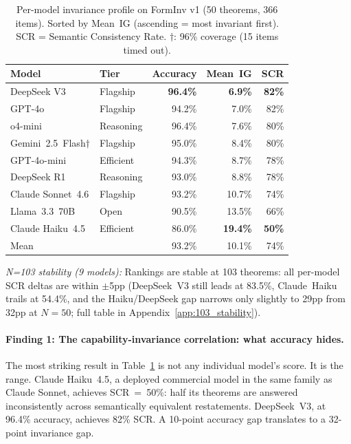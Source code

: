 \documentclass{article}
\begin{document}
\begin{table}[t]
\centering\small
\caption{Per-model invariance profile on FormInv v1 (50 theorems, 366 items). Sorted by Mean~IG (ascending = most invariant first). SCR = Semantic Consistency Rate. $\dagger$: 96\% coverage (15 items timed out).}
\label{tab:main}
\begin{tabular}{llrrr}
\toprule
Model & Tier & Accuracy & Mean~IG & SCR \\
\midrule
DeepSeek V3            & Flagship   & \textbf{96.4\%} & \textbf{6.9\%}  & \textbf{82\%} \\
GPT-4o                 & Flagship   & 94.2\% & 7.0\%  & 82\% \\
o4-mini                & Reasoning  & 96.4\% & 7.6\%  & 80\% \\
Gemini~2.5~Flash$\dagger$ & Flagship & 95.0\% & 8.4\%  & 80\% \\
GPT-4o-mini            & Efficient  & 94.3\% & 8.7\%  & 78\% \\
DeepSeek R1            & Reasoning  & 93.0\% & 8.8\%  & 78\% \\
Claude Sonnet~4.6      & Flagship   & 93.2\% & 10.7\% & 74\% \\
Llama~3.3~70B          & Open       & 90.5\% & 13.5\% & 66\% \\
Claude Haiku~4.5       & Efficient  & 86.0\% & \textbf{19.4\%} & \textbf{50\%} \\
\midrule
Mean                   &            & 93.2\% & 10.1\% & 74\% \\
\bottomrule
\end{tabular}
\medskip

\noindent\textit{N=103 stability (9 models):}
Rankings are stable at 103 theorems: all per-model SCR deltas are within $\pm$5pp (DeepSeek~V3 still leads at 83.5\%, Claude~Haiku trails at 54.4\%, and the Haiku/DeepSeek gap narrows only slightly to 29pp from 32pp at $N=50$; full table in Appendix~\ref{app:103_stability}).
\end{table}

\paragraph{Finding 1: The capability-invariance correlation: what accuracy hides.}
The most striking result in Table~\ref{tab:main} is not any individual model's score.
It is the range.
Claude Haiku~4.5, a deployed commercial model in the same family as Claude Sonnet, achieves SCR~=~50\%:
half its theorems are answered inconsistently across semantically equivalent restatements.
DeepSeek~V3, at 96.4\% accuracy, achieves 82\% SCR.
A 10-point accuracy gap translates to a 32-point invariance gap.
\end{document}
